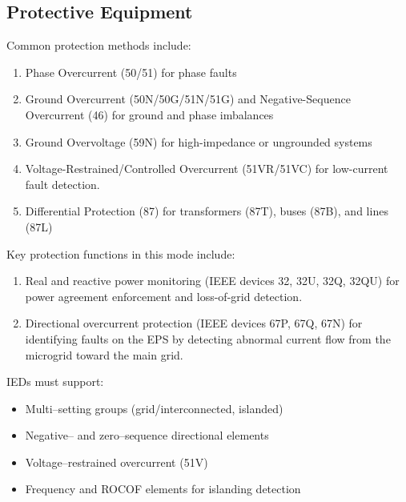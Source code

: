 \subsection{Protective Equipment}



Common protection methods include:

\begin{enumerate}
	\item Phase Overcurrent (50/51) for phase faults
	\item Ground Overcurrent (50N/50G/51N/51G) and Negative-Sequence Overcurrent (46) for ground and phase imbalances
	\item Ground Overvoltage (59N) for high-impedance or ungrounded systems
         \item Voltage-Restrained/Controlled Overcurrent (51VR/51VC) for low-current fault detection.
          \item  Differential Protection (87) for transformers (87T), buses (87B), and lines (87L)
    
\end{enumerate}

Key protection functions in this mode include:

\begin{enumerate}

\item Real and reactive power monitoring (IEEE devices 32, 32U, 32Q, 32QU) for power agreement enforcement and loss-of-grid detection.

\item Directional overcurrent protection (IEEE devices 67P, 67Q, 67N) for identifying faults on the EPS by detecting abnormal current flow from the microgrid toward the main grid.

\end{enumerate}


IEDs must support:
\begin{itemize}
    \item Multi–setting groups (grid/interconnected, islanded)
    \item Negative– and zero–sequence directional elements
    \item Voltage–restrained overcurrent (51V)
    \item Frequency and ROCOF elements for islanding detection
\end{itemize}



